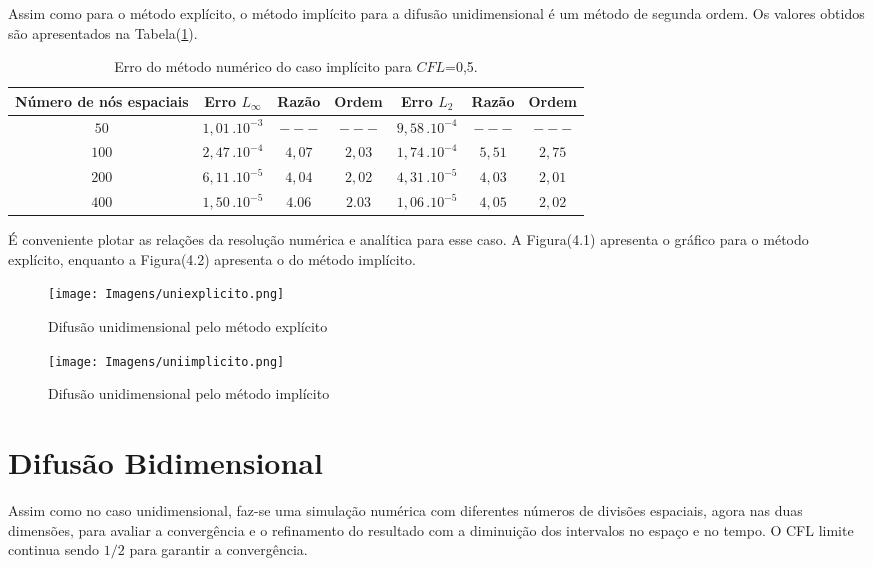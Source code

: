 	Assim como para o método explícito, o método implícito para a difusão unidimensional é um método de segunda ordem. Os valores obtidos são apresentados na Tabela(\ref{tabela2}).
	
\begin{table}[h!]
	\caption{Erro do método numérico do caso implícito para $CFL$=0,5.}
	\label{tabela2}
	\centering
	\begin{tabular}{c | c c c | c c c}
		\hline
		Número de nós  espaciais&       Erro $L_\infty$       	& Razão   	 & Ordem   & Erro $L_{2}$ 				& Razão 	  & Ordem  \\ \hline
		$50$ 					&		$1,01 \, . 10^{-3}$     & $---$      & $---$   &       $9,58 \, . 10^{-4}$  & $---$       & $---$    \\ 
		$100$ 					&       $2,47 \, . 10^{-4}$     & $4,07$     & $2,03$  &       $1,74 \, . 10^{-4}$  & $5,51$      & $2,75$    \\ 
		$200$ 					&       $6,11 \, . 10^{-5}$     & $4,04$     & $2,02$  &       $4,31 \, . 10^{-5}$  & $4,03$      & $2,01$    \\ 
		$400$ 					&       $1,50 \, . 10^{-5}$     & $4.06$     & $2.03$  &       $1,06 \, . 10^{-5}$  & $4,05$      & $2,02$    \\ \hline
	\end{tabular}
\end{table}

	É conveniente plotar as relações da resolução numérica e analítica para esse caso. A Figura(4.1) apresenta o gráfico para o método explícito, enquanto a Figura(4.2) apresenta o do método implícito.
	
\begin{figure}[ht!]
	\label{explicito1}
	\centering
	\texttt{[image: Imagens/uniexplicito.png]}
	\caption{Difusão unidimensional pelo método explícito}
\end{figure}

\begin{figure}[ht!]
	\label{implicito1}
	\centering
	\texttt{[image: Imagens/uniimplicito.png]}
	\caption{Difusão unidimensional pelo método implícito}
\end{figure}

\newpage
\section{Difusão Bidimensional}
\noindent

	Assim como no caso unidimensional, faz-se uma simulação numérica com diferentes números de divisões espaciais, agora nas duas dimensões, para avaliar a convergência e o refinamento do resultado com a diminuição dos intervalos no espaço e no tempo. O CFL limite continua sendo $1/2$ para garantir a convergência.
	

